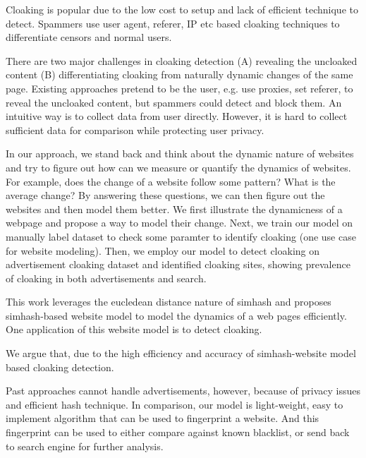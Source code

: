 Cloaking is popular due to the low cost to setup and lack of efficient technique
to detect. Spammers use user agent, referer, IP etc based cloaking techniques to
differentiate censors and normal users.

There are two major challenges in cloaking detection (A) revealing the uncloaked
content (B) differentiating cloaking from naturally dynamic changes of the same
page. Existing approaches pretend to be the user, e.g. use proxies, set referer,
to reveal the uncloaked content, but spammers could detect and block them. An
intuitive way is to collect data from user directly. However, it is hard to
collect sufficient data for comparison while protecting user privacy.

In our approach, we stand back and think about the dynamic nature of websites
and try to figure out how can we measure or quantify the dynamics of websites.
For example, does the change of a website follow some pattern? What is the
average change? By answering these questions, we can then figure out the
websites and then model them better. We first illustrate the dynamicness of a
webpage and propose a way to model their change.
Next, we train our model on manually label dataset to check some paramter to
identify cloaking (one use case for website modeling). 
Then, we employ our model to detect cloaking on advertisement cloaking dataset
and identified  cloaking sites, showing prevalence of cloaking in both
advertisements and search.



This work leverages the eucledean distance nature of simhash and proposes
simhash-based website model to model the dynamics of a web pages efficiently.
One application of this website model is to detect cloaking.

We argue that, due to the high efficiency and accuracy of simhash-website model
based cloaking detection.


Past approaches cannot handle advertisements, however, because of privacy issues
and efficient hash technique. In comparison, our model is light-weight, easy to
implement algorithm that can be used to fingerprint a website. And this
fingerprint can be used to either compare against known blacklist, or send back
to search engine for further analysis.



